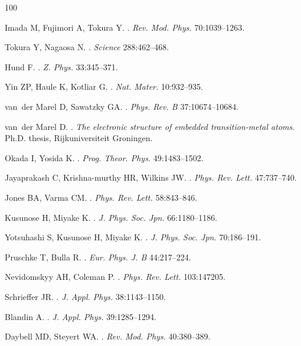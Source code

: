 \documentclass[]{ar2e-changed}%
\begin{document}
\begin{thebibliography}{100}
\footnotesize

Imada M, Fujimori A, Tokura Y.
.
\newblock \emph{Rev. Mod. Phys.} 70:1039--1263.

Tokura Y, Nagaosa N.
.
\newblock \emph{Science} 288:462--468.

Hund F.
.
\newblock \emph{Z. Phys.} 33:345--371.

Yin ZP, Haule K, Kotliar G.
.
\newblock \emph{Nat. Mater.} 10:932--935.

van~der Marel D, Sawatzky GA.
.
\newblock \emph{Phys. Rev. B} 37:10674--10684.

van~der Marel D.
.
\newblock \emph{The electronic structure of embedded transition-metal atoms}.
\newblock Ph.D. thesis, Rijkuniversiteit Groningen.

Okada I, Yosida K.
.
\newblock \emph{Prog. Theor. Phys.} 49:1483--1502.

Jayaprakash C, Krishna-murthy HR, Wilkins JW.
.
\newblock \emph{Phys. Rev. Lett.} 47:737--740.

Jones BA, Varma CM.
.
\newblock \emph{Phys. Rev. Lett.} 58:843--846.

Kusunose H, Miyake K.
.
\newblock \emph{J. Phys. Soc. Jpn.} 66:1180--1186.

Yotsuhashi S, Kusunose H, Miyake K.
.
\newblock \emph{J. Phys. Soc. Jpn.} 70:186--191.

Pruschke T, Bulla R.
.
\newblock \emph{Eur. Phys. J. B} 44:217--224.

Nevidomskyy AH, Coleman P.
.
\newblock \emph{Phys. Rev. Lett.} 103:147205.

Schrieffer JR.
.
\newblock \emph{J. Appl. Phys.} 38:1143--1150.

Blandin A.
.
\newblock \emph{J. Appl. Phys.} 39:1285--1294.

Daybell MD, Steyert WA.
.
\newblock \emph{Rev. Mod. Phys.} 40:380--389.


\end{thebibliography}
\end{document}

